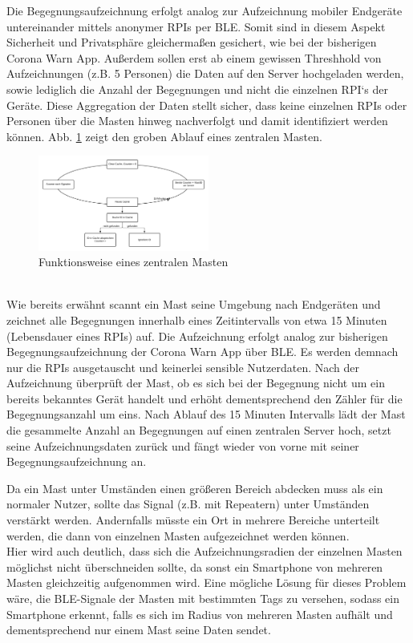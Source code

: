 \documentclass[conference,compsoc]{IEEEtran}
\begin{document}
Die Begegnungsaufzeichnung erfolgt analog zur Aufzeichnung mobiler Endgeräte untereinander mittels anonymer RPIs per BLE. 
Somit sind in diesem Aspekt Sicherheit und Privatsphäre gleichermaßen gesichert, wie bei der bisherigen Corona Warn App. 
Außerdem sollen erst ab einem gewissen Threshhold von Aufzeichnungen (z.B. 5 Personen) die Daten auf den Server hochgeladen werden, sowie lediglich die Anzahl der Begegnungen und nicht die einzelnen RPI‘s der Geräte. 
Diese Aggregation der Daten stellt sicher, dass keine einzelnen RPIs oder Personen über die Masten hinweg nachverfolgt und damit identifiziert werden können. 
Abb. \ref{mast_func} zeigt den groben Ablauf eines zentralen Masten. \\ 
\begin{figure}[h]
	\centering
	\includegraphics[width=0.5\textwidth]{"Mast_functionality"}
	\caption{Funktionsweise eines zentralen Masten}
	\label{mast_func}
\end{figure}
\\
Wie bereits erwähnt scannt ein Mast seine Umgebung nach Endgeräten und zeichnet alle Begegnungen innerhalb eines Zeitintervalls von etwa 15 Minuten (Lebensdauer eines RPIs) auf. 
Die Aufzeichnung erfolgt analog zur bisherigen Begegnungsaufzeichnung der Corona Warn App über BLE. 
Es werden demnach nur die RPIs ausgetauscht und keinerlei sensible Nutzerdaten. 
Nach der Aufzeichnung überprüft der Mast, ob es sich bei der Begegnung nicht um ein bereits bekanntes Gerät handelt und erhöht dementsprechend den Zähler für die Begegnungsanzahl um eins. 
Nach Ablauf des 15 Minuten Intervalls lädt der Mast die gesammelte Anzahl an Begegnungen auf einen zentralen Server hoch, setzt seine Aufzeichnungsdaten zurück und  fängt wieder von vorne mit seiner Begegnungsaufzeichnung an. 

Da ein Mast unter Umständen einen größeren Bereich abdecken muss als ein normaler Nutzer, sollte das Signal (z.B. mit Repeatern) unter Umständen verstärkt werden.
Andernfalls müsste ein Ort in mehrere Bereiche unterteilt werden, die dann von einzelnen Masten aufgezeichnet werden können. \\
Hier wird auch deutlich, dass sich die Aufzeichnungsradien der einzelnen Masten möglichst nicht überschneiden sollte, da sonst ein Smartphone von mehreren Masten gleichzeitig aufgenommen wird.
Eine mögliche Lösung für dieses Problem wäre, die BLE-Signale der Masten mit bestimmten Tags zu versehen, sodass ein Smartphone erkennt, falls es sich im Radius von mehreren Masten aufhält und dementsprechend nur einem Mast seine Daten sendet. 
\end{document}
